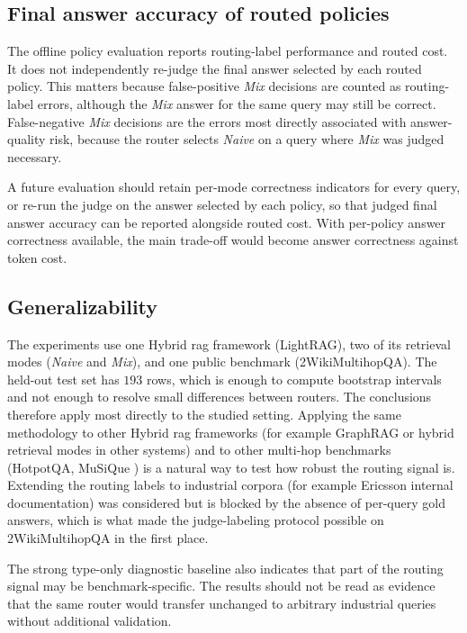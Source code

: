 \documentclass[english, bibtex]{kththesis}               %
\numberwithin{listing}{chapter}
\begin{document}
\subsection{Final answer accuracy of routed policies}
\label{sec:limitFinalAnswerAccuracy}

The offline policy evaluation reports routing-label performance and routed cost. It does not independently re-judge the final answer selected by each routed policy. This matters because false-positive \emph{Mix} decisions are counted as routing-label errors, although the \emph{Mix} answer for the same query may still be correct. False-negative \emph{Mix} decisions are the errors most directly associated with answer-quality risk, because the router selects \emph{Naive} on a query where \emph{Mix} was judged necessary.

A future evaluation should retain per-mode correctness indicators for every query, or re-run the judge on the answer selected by each policy, so that judged final answer accuracy can be reported alongside routed cost. With per-policy answer correctness available, the main trade-off would become answer correctness against token cost.

\subsection{Generalizability}
\label{sec:limitGeneralizability}

The experiments use one Hybrid \gls{rag} framework (LightRAG), two of its retrieval modes (\emph{Naive} and \emph{Mix}), and one public benchmark (2WikiMultihopQA). The held-out test set has $193$ rows, which is enough to compute bootstrap intervals and not enough to resolve small differences between routers. The conclusions therefore apply most directly to the studied setting. Applying the same methodology to other Hybrid \gls{rag} frameworks (for example GraphRAG \cite{edge2024graphrag} or hybrid retrieval modes in other systems) and to other multi-hop benchmarks (HotpotQA, MuSiQue \cite{yang2018hotpotqa,trivedi2022musique}) is a natural way to test how robust the routing signal is. Extending the routing labels to industrial corpora (for example Ericsson internal documentation) was considered but is blocked by the absence of per-query gold answers, which is what made the judge-labeling protocol possible on 2WikiMultihopQA in the first place.

The strong type-only diagnostic baseline also indicates that part of the routing signal may be benchmark-specific. The results should not be read as evidence that the same router would transfer unchanged to arbitrary industrial queries without additional validation.
\end{document}
